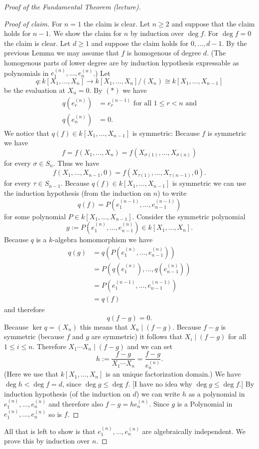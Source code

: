 \begin{proof}[Proof of the Fundamental Theorem (lecture)]
\begin{proof}[Proof of claim]
  For $n = 1$ the claim is clear. Let $n \geq 2$ and suppose that the claim holds for $n-1$. We show the claim for $n$ by induction over $\deg f$. For $\deg f = 0$ the claim is clear. Let $d \geq 1$ and suppose the claim holds for $0, \dotsc, d-1$. By the previous Lemma we may assume that $f$ is homogenous of degree $d$. (The homogenous parts of lower degree are by induction hypothesis expressable as polynomials in $e^{(n)}_1, \dotsc, e^{(n)}_n$.) Let
  \[
   q \colon k[X_1, \dotsc, X_n] \to k[X_1, \dotsc, X_n]/(X_n) \cong k[X_1, \dotsc, X_{n-1}]
  \]
  be the evaluation at $X_n = 0$. By $(\ast)$ we have
  \begin{align*}
   q\left( e^{(n)}_r \right) &= e^{(n-1)}_r \text{ for all } 1 \leq r < n \text{ and}\\
   q\left( e^{(n)}_n \right) &= 0.
  \end{align*}
  We notice that $q(f) \in k[X_1, \dotsc, X_{n-1}]$ is symmetric: Because $f$ is symmetric we have
  \[
   f = f(X_1, \dotsc, X_n) = f(X_{\sigma(1)}, \dotsc, X_{\sigma(n)})
  \]
  for every $\sigma \in S_n$. Thus we have
  \[
   f(X_1, \dotsc, X_{n-1}, 0) = f(X_{\tau(1)}, \dotsc, X_{\tau(n-1)}, 0).
  \]
  for every $\tau \in S_{n-1}$. Because $q(f) \in k[X_1, \dotsc, X_{n-1}]$ is symmetric we can use the induction hypothesis (from the induction on $n$) to write
  \[
   q(f) = P\left(e^{(n-1)}_1, \dotsc, e^{(n-1)}_{n-1}\right)
  \]
  for some polynomial $P \in k[X_1, \dotsc, X_{n-1}]$. Consider the symmetric polynomial
  \[
   g := P\left(e^{(n)}_1, \dotsc, e^{(n)}_{n-1}\right) \in k[X_1, \dotsc, X_n].
  \]
  Because $q$ is a $k$-algebra homomorphism we have
  \begin{align*}
   q(g)
   &= q\left( P\left(e^{(n)}_1, \dotsc, e^{(n)}_{n-1}\right) \right) \\
   &= P\left( q\left(e^{(n)}_1\right), \dotsc, q\left(e^{(n)}_{n-1}\right) \right) \\
   &= P\left( e^{(n-1)}_1, \dotsc, e^{(n-1)}_{n-1} \right) \\
   &= q(f)
  \end{align*}
  and therefore
  \[
   q(f-g) = 0.
  \]
  Because $\ker q = (X_n)$ this means that $X_n \mid (f-g)$. Because $f-g$ is symmetric (because $f$ and $g$ are symmetric) it follows that $X_i \mid (f-g)$ for all $1 \leq i \leq n$. Therefore $X_1 \dotsm X_n \mid (f-g)$ and we can set
  \[
   h := \frac{f-g}{X_1 \dotsm X_n} = \frac{f-g}{e^{(n)}_n}.
  \]
  (Here we use that $k[X_1, \dotsc, X_n]$ is an unique factorization domain.) We have $\deg h < \deg f = d$, since $\deg g \leq \deg f$. [I have no idea why $\deg g \leq \deg f$.] By induction hypothesis (of the induction on $d$) we can write $h$ as a polynomial in $e^{(n)}_1, \dotsc, e^{(n)}_n$ and therefore also $f-g = h e^{(n)}_n$. Since $g$ is a Polynomial in $e^{(n)}_1, \dotsc, e^{(n)}_n$ so is $f$.
 \end{proof}
  All that is left to show is that $e^{(n)}_1, \dotsc, e^{(n)}_n$ are algebraically independent. We prove this by induction over $n$.
  

\end{proof}
